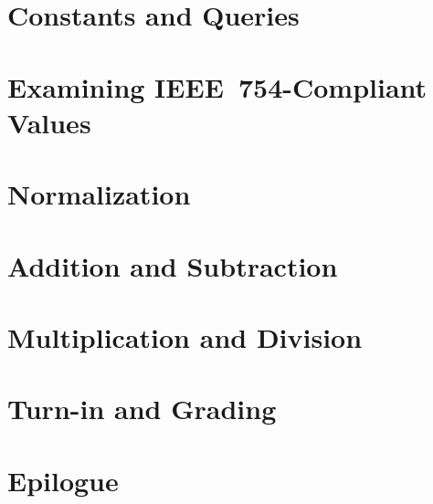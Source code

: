     \section{Constants and Queries}                             

    \section{Examining IEEE~754-Compliant Values}               

    \section{Normalization}                                     

    \section{Addition and Subtraction}                          

    \section{Multiplication and Division}                       

    \section{Turn-in and Grading}                               

    \section*{Epilogue}                                         \GoingBackToTheZoo


